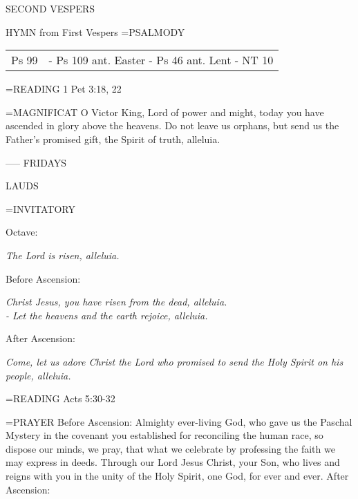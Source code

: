 \begin{flushleft}\normalsize SECOND VESPERS\\\end{flushleft}
HYMN from First Vespers
\hangindent=\parindent \small{PSALMODY}
\begin{center}
\begin{tabular}{ l l }
Ps 99 &  - Ps 109 ant. Easter - Ps 46 ant. Lent - NT 10\\
\end{tabular}
\end{center}		

\hangindent=\parindent \small{\uppercase{READING}}    1 Pet 3:18, 22 \textbf{   \\}

\hangindent=\parindent \small{MAGNIFICAT 	O Victor King, Lord of power and might, today you have ascended in glory above the heavens. Do not leave us orphans, but send us the Father's promised gift, the Spirit of truth, alleluia.\\}

-----
FRIDAYS

\begin{flushleft}\normalsize LAUDS\\\end{flushleft}
\hangindent=\parindent \small{INVITATORY}
\begin{center}
\end{center}Octave:\begin{center}\textit{	The Lord is risen, alleluia.\\}
\end{center}Before Ascension:\begin{center}\textit{	Christ Jesus, you have risen from the dead, alleluia.\\}
\textit{			- Let the heavens and the earth rejoice, alleluia.\\}
\end{center}After Ascension:\begin{center}\textit{	Come, let us adore Christ the Lord who promised to send the Holy Spirit on his people, alleluia.\\}
\end{center}

\hangindent=\parindent \small{\uppercase{READING}}    Acts 5:30-32 \textbf{   \\}

\hangindent=\parindent \small{PRAYER }
Before Ascension:	Almighty ever-living God, who gave us the Paschal Mystery in the covenant you established for reconciling the human race, so dispose our minds, we pray, that what we celebrate by professing the faith we may express in deeds. Through our Lord Jesus Christ, your Son, who lives and reigns with you in the unity of the Holy Spirit, one God, for ever and ever.
After Ascension:	


